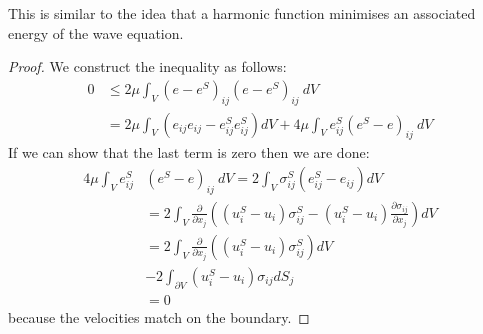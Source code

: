 \documentclass[../Main.tex]{subfiles}
\begin{document}
\begin{remark}
    This is similar to the idea that a harmonic function minimises an associated energy of the wave equation.
\end{remark}
\begin{proof}
    We construct the inequality as follows:
    \begin{align*}
        0 &\leq 2\mu \int_V \left(e - e^S\right)_{ij} \left(e - e^S\right)_{ij}~dV \\
        &= 2\mu \int_V \left(e_{ij} e_{ij} - e_{ij}^S e_{ij}^S\right) dV + 4\mu \int_V e^S_{ij} \left(e^S - e\right)_{ij}~dV
    \end{align*}
    If we can show that the last term is zero then we are done:
    \begin{align*}
        4\mu \int_V e^S_{ij} &\left(e^S - e\right)_{ij}~dV= 2\int_V \sigma_{ij}^S \left(e_{ij}^S - e_{ij}\right)dV \\
        &= 2 \int_V \frac{\partial}{\partial x_j} \left(\left(u_i^S - u_i\right)\sigma_{ij}^S - (u_i^S - u_i) \frac{\partial \sigma_{ij}}{\partial x_j}\right) dV \\
        &= 2 \int_V \frac{\partial}{\partial x_j} \left(\left(u_i^S - u_i\right)\sigma_{ij}^S\right) dV \\
        &- 2\int_{\partial V} \left(u_i^S - u_i\right) \sigma_{ij} dS_j \\
        &= 0
    \end{align*}
    because the velocities match on the boundary.
\end{proof}
\end{document}
